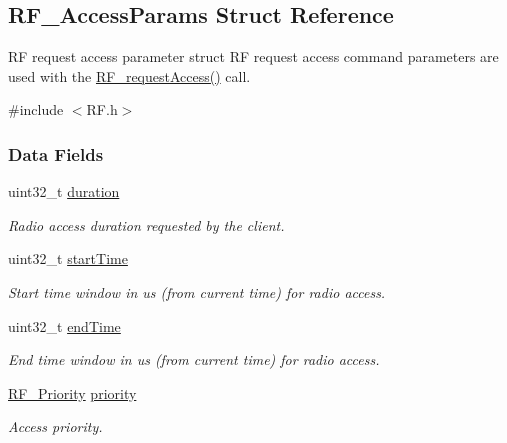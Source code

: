 \subsection{R\+F\+\_\+\+Access\+Params Struct Reference}
\label{struct_r_f___access_params}


R\+F request access parameter struct R\+F request access command parameters are used with the \hyperlink{_r_f_8h_a40a5506c05a11a3cd9d379cedad5b5d0}{R\+F\+\_\+request\+Access()} call.  




{\ttfamily \#include $<$R\+F.\+h$>$}

\subsubsection*{Data Fields}
\begin{DoxyCompactItemize}
\item 
uint32\+\_\+t \hyperlink{struct_r_f___access_params_a0d6adb1c309962431a8b777a44325ade}{duration}
\begin{DoxyCompactList}\small\item\em Radio access duration requested by the client. \end{DoxyCompactList}\item 
uint32\+\_\+t \hyperlink{struct_r_f___access_params_a4ec6ddde388c80d5e2d4b3d8311fcaaf}{start\+Time}
\begin{DoxyCompactList}\small\item\em Start time window in us (from current time) for radio access. \end{DoxyCompactList}\item 
uint32\+\_\+t \hyperlink{struct_r_f___access_params_ac15dd6465c631e5b2026ec34f6fc41b3}{end\+Time}
\begin{DoxyCompactList}\small\item\em End time window in us (from current time) for radio access. \end{DoxyCompactList}\item 
\hyperlink{_r_f_8h_ae5f9a893d178e64e6d0a7a783ea06e32}{R\+F\+\_\+\+Priority} \hyperlink{struct_r_f___access_params_a9ed4a1af207a7f63beb8cfebdd940894}{priority}
\begin{DoxyCompactList}\small\item\em Access priority. \end{DoxyCompactList}\end{DoxyCompactItemize}


